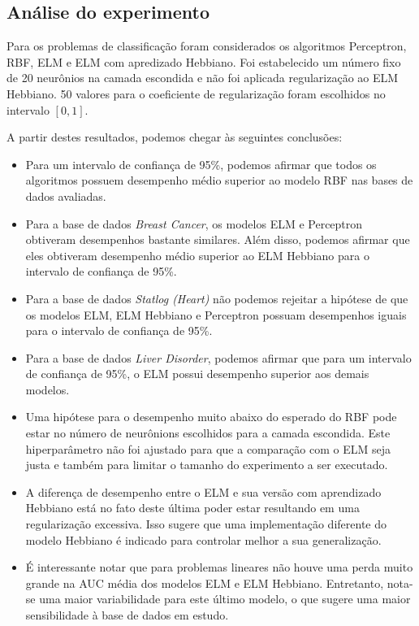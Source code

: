 \documentclass[conference]{IEEEtran}
\begin{document}
	\subsection{Análise do experimento}

	Para os problemas de classificação foram considerados os algoritmos Perceptron, RBF, ELM e ELM com apredizado Hebbiano. Foi estabelecido um número fixo de 20 neurônios na camada escondida e não foi aplicada regularização ao ELM Hebbiano. 50 valores para o coeficiente de regularização foram escolhidos no intervalo $[0,1]$. 
	
	A partir destes resultados, podemos chegar às seguintes conclusões:
	\begin{itemize}
		\item Para um intervalo de confiança de 95\%, podemos afirmar que todos os algoritmos possuem desempenho médio superior ao modelo RBF nas bases de dados avaliadas.
		\item Para a base de dados \textit{Breast Cancer}, os modelos ELM e Perceptron obtiveram desempenhos bastante similares. Além disso, podemos afirmar que eles obtiveram desempenho médio superior ao ELM Hebbiano para o intervalo de confiança de 95\%.
		\item Para a base de dados \textit{Statlog (Heart)} não podemos rejeitar a hipótese de que os modelos ELM, ELM Hebbiano e Perceptron possuam desempenhos iguais para o intervalo de confiança de 95\%.
		\item Para a base de dados \textit{Liver Disorder}, podemos afirmar que para um intervalo de confiança de 95\%, o ELM possui desempenho superior aos demais modelos.
		\item Uma hipótese para o desempenho muito abaixo do esperado do RBF pode estar no número de neurônions escolhidos para a camada escondida. Este hiperparâmetro não foi ajustado para que a comparação com o ELM seja justa e também para limitar o tamanho do experimento a ser executado. 
		\item A diferença de desempenho entre o ELM e sua versão com aprendizado Hebbiano está no fato deste última poder estar resultando em uma regularização excessiva. Isso sugere que uma implementação diferente do modelo Hebbiano é indicado para controlar melhor a sua generalização.
		\item É interessante notar que para problemas lineares não houve uma perda muito grande na AUC média dos modelos ELM e ELM Hebbiano. Entretanto, nota-se uma maior variabilidade para este último modelo, o que sugere uma maior sensibilidade à base de dados em estudo. 
	\end{itemize}
\end{document}
